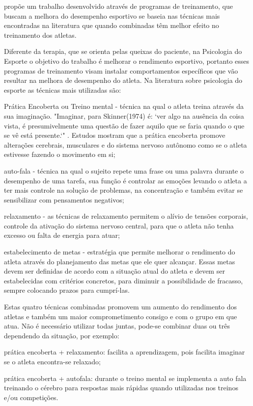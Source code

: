 \begin{Desenvolvimento}
 propõe um trabalho desenvolvido através de programas de treinamento, que buscam a melhora do desempenho esportivo se baseia nas técnicas mais encontradas na literatura que quando combinadas têm melhor efeito no treinamento dos atletas. 

Diferente da terapia, que se orienta pelas queixas do paciente, na Psicologia do Esporte o objetivo do trabalho é melhorar o rendimento esportivo, portanto esses programas de treinamento visam instalar comportamentos específicos que vão resultar na melhora  de desempenho do atleta. Na literatura sobre psicologia do esporte as técnicas mais utilizadas são:

\begin{alinea}
  \item Prática Encoberta ou Treino mental - técnica na qual o atleta treina através da sua imaginação. "Imaginar, para Skinner(1974) é: `ver algo na ausência da coisa vista, é presumivelmente uma questão de fazer aquilo que se faria quando o que se vê está presente.`" . Estudos mostram que a prática encoberta promove alterações cerebrais, musculares e do sistema nervoso autônomo como se o atleta estivesse fazendo o movimento em si;
  \item auto-fala - técnica na qual o sujeito repete uma frase ou uma palavra durante o desempenho de uma tarefa, sua função é controlar as emoções levando o atleta a ter mais controle na solução de problemas, na concentração e também evitar se sensibilizar com pensamentos negativos;
  \item relaxamento - as técnicas de relaxamento permitem o alívio de tensões corporais, controle da ativação do sistema nervoso central, para que o atleta não tenha excesso ou falta de energia para atuar;
  \item estabelecimento de metas -  estratégia que permite melhorar o rendimento do atleta através do planejamento das metas que ele quer alcançar. Essas metas devem ser definidas de acordo com a situação atual do atleta e devem ser estabelecidas com critérios concretos, para diminuir a possibilidade de fracasso, sempre colocando prazos para cumprí-las.
\end{alinea}

Estas quatro técnicas combinadas promovem um aumento do rendimento dos atletas e também um maior comprometimento consigo e com o grupo em que atua. Não é necessário utilizar todas juntas, pode-se combinar duas ou três dependendo da situação, por exemplo:
\begin{alinea}
  \item prática encoberta + relaxamento: facilita a aprendizagem, pois facilita imaginar se o atleta encontra-se relaxado;
  \item prática encoberta + autofala: durante o treino mental se implementa a auto fala treinando o cérebro para respostas mais rápidas quando utilizadas nos treinos e/ou competições.
\end{alinea}


\end{Desenvolvimento}
